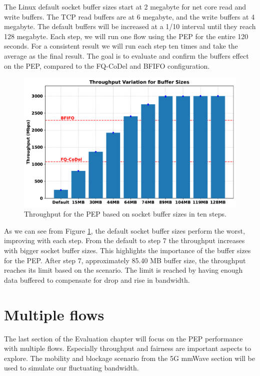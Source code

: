 \documentclass[a4paper,english, 11pt]{report}
\begin{document}
The Linux default socket buffer sizes start at 2 megabyte for net core read and write buffers. The TCP read buffers are at 6 megabyte, and the write buffers at 4 megabyte. The default buffers will be increased at a 1/10 interval until they reach 128 megabyte. Each step, we will run one flow using the PEP for the entire 120 seconds. For a consistent result we will run each step ten times and take the average as the final result. The goal is to evaluate and confirm the buffers effect on the PEP, compared to the FQ-CoDel and BFIFO configuration.\\

\begin{figure}[!h!] %
	\centering
	\includegraphics[scale=0.55]{../diagrams/witestlab/throughput/buffersizes.pdf}
  	\caption{Throughput for the PEP based on socket buffer sizes in ten steps.}
  	\label{fig:throughput_all}
\end{figure}

As we can see from Figure \ref{fig:throughput_all}, the default socket buffer sizes perform the worst, improving with each step. From the default to step 7 the throughput increases with bigger socket buffer sizes. This highlights the importance of the buffer sizes for the PEP. After step 7, approximately 85.40 MB buffer size, the throughput reaches its limit based on the scenario. The limit is reached by having enough data buffered to compensate for drop and rise in bandwidth.\\

\section{Multiple flows}
The last section of the Evaluation chapter will focus on the PEP performance with multiple flows. Especially throughput and fairness are important aspects to explore. The mobility and blockage scenario from the 5G mmWave section will be used to simulate our fluctuating bandwidth.\\
\end{document}
